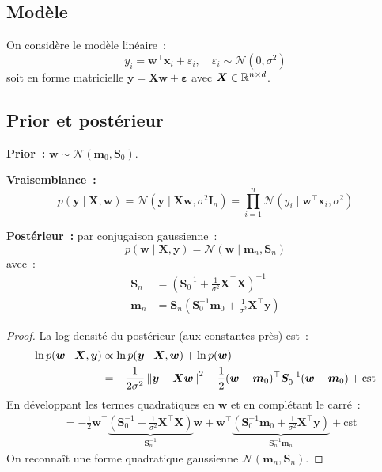 \subsection{Mod\`ele}

On consid\`ere le mod\`ele lin\'eaire~:
\begin{equation}
  y_i = \bm{w}^\top \bm{x}_i + \varepsilon_i, \quad
  \varepsilon_i \sim \mathcal{N}(0, \sigma^2)
\end{equation}
soit en forme matricielle $\bm{y} = \bm{X}\bm{w} + \bm{\varepsilon}$ avec
$\bm{X} \in \mathbb{R}^{n \times d}$.

\subsection{Prior et post\'erieur}

\begin{formules}[title=\textbf{R\'egression lin\'eaire bay\'esienne --- D\'erivation compl\`ete}]
\textbf{Prior~:} $\bm{w} \sim \mathcal{N}(\bm{m}_0, \bm{S}_0)$.

\textbf{Vraisemblance~:}
\begin{equation}
  p(\bm{y} \mid \bm{X}, \bm{w}) = \mathcal{N}(\bm{y} \mid \bm{X}\bm{w},
  \sigma^2 \bm{I}_n) = \prod_{i=1}^n \mathcal{N}(y_i \mid \bm{w}^\top
  \bm{x}_i, \sigma^2)
\end{equation}

\textbf{Post\'erieur~:} par conjugaison gaussienne~:
\begin{equation}
  p(\bm{w} \mid \bm{X}, \bm{y}) = \mathcal{N}(\bm{w} \mid \bm{m}_n,
  \bm{S}_n)
  \label{eq:blr-posterior}
\end{equation}
avec~:
\begin{align}
  \bm{S}_n &= \left(\bm{S}_0^{-1} + \frac{1}{\sigma^2}\bm{X}^\top
  \bm{X}\right)^{-1}
  \label{eq:blr-Sn} \\
  \bm{m}_n &= \bm{S}_n \left(\bm{S}_0^{-1}\bm{m}_0 +
  \frac{1}{\sigma^2}\bm{X}^\top \bm{y}\right)
  \label{eq:blr-mn}
\end{align}
\end{formules}

\begin{proof}
La log-densit\'e du post\'erieur (aux constantes pr\`es) est~:
\begin{align}
  \ln p(\bm{w} \mid \bm{X}, \bm{y}) &\propto \ln p(\bm{y} \mid \bm{X},
  \bm{w}) + \ln p(\bm{w}) \\
  &= -\frac{1}{2\sigma^2}\left\| \bm{y} - \bm{X}\bm{w} \right\|^2 -
  \frac{1}{2}(\bm{w} - \bm{m}_0)^\top \bm{S}_0^{-1}(\bm{w} - \bm{m}_0)
  + \text{cst}
\end{align}
En d\'eveloppant les termes quadratiques en $\bm{w}$ et en compl\'etant le
carr\'e~:
\begin{align}
  &= -\frac{1}{2}\bm{w}^\top\!\underbrace{\left(\bm{S}_0^{-1} +
  \frac{1}{\sigma^2}\bm{X}^\top\bm{X}\right)}_{\bm{S}_n^{-1}}\!\bm{w}
  + \bm{w}^\top\!\underbrace{\left(\bm{S}_0^{-1}\bm{m}_0 +
  \frac{1}{\sigma^2}\bm{X}^\top\bm{y}\right)}_{\bm{S}_n^{-1}\bm{m}_n}
  + \text{cst}
\end{align}
On reconna\^it une forme quadratique gaussienne
$\mathcal{N}(\bm{m}_n, \bm{S}_n)$.
\end{proof}

